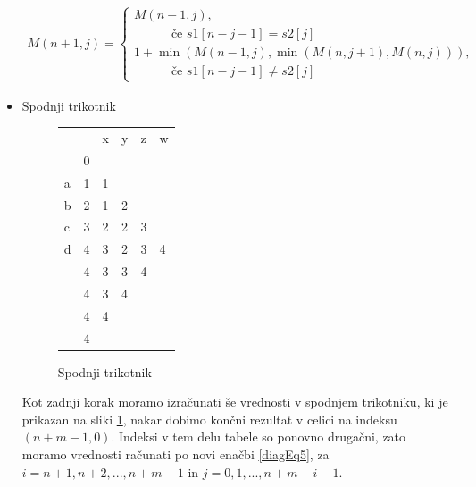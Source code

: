 \documentclass[a4paper,12pt,openright]{book}
\begin{document}
\begin{itemize}
\begin{equation}
\label{diagEq4}
\begin{aligned}
M(n+1, j) =
\begin{cases}
     M(n-1, j) ,     \\ \quad \quad \quad \text{če } s1[n-j-1]=s2[j]\\
     1 + \min(M(n-1, j), \min(M(n, j+1), M(n, j))) , \\ \quad \quad \quad \text{če } s1[n-j-1] \neq s2[j]
  \end{cases}
\end{aligned}
\end{equation}

    \item Spodnji trikotnik
    
\begin{figure}[htb]
\centering
\begin{tabular}{|l|l|l|l|l|l|}
\cline{3-6}
\multicolumn{2}{c|}{}  & x & y & z & w\\ \cline{2-6}
\multicolumn{1}{c|}{} & 0 & \multicolumn{4}{c}{} \\ \cline{1-3}
a  & 1 & 1 &  \multicolumn{3}{c}{} \\ \cline{1-4}
b  & 2 & 1 & 2 & \multicolumn{2}{c}{} \\ \cline{1-5}
c  & 3 & 2 & 2 & 3 & \multicolumn{1}{c}{} \\ \cline{1-6}
d  & 4 & 3 & 2 & 3 & 4 \\ \hline
 \multicolumn{1}{c|}{} & 4 & 3 & 3 & 4 & \multicolumn{1}{c}{}  \\ \cline{2-5}
\multicolumn{1}{c|}{} & \cellcolor{blue!15}4 & \cellcolor{blue!15}3 & \cellcolor{blue!15}4 & \multicolumn{2}{c}{} \\ \cline{2-4}
\multicolumn{1}{c|}{} & \cellcolor{blue!15}4 & \cellcolor{blue!15}4 &  \multicolumn{3}{c}{}   \\ \cline{2-3}
\multicolumn{1}{c|}{} & \cellcolor{blue!25}4 & \multicolumn{4}{c}{}  \\ \cline{2-2}
\end{tabular}
\caption{Spodnji trikotnik}
\label{diagMemory4}
\end{figure}

Kot zadnji korak moramo izračunati še vrednosti v spodnjem trikotniku, ki je prikazan na sliki \ref{diagMemory4}, nakar dobimo končni rezultat v celici na indeksu $(n+m-1, 0)$. Indeksi v tem delu tabele so ponovno drugačni, zato moramo vrednosti računati po novi enačbi \ref{diagEq5}, za $i=n+1,n+2,...,n+m-1$ in $j=0,1,...,n+m-i-1$. 


\end{itemize}
\end{document}
